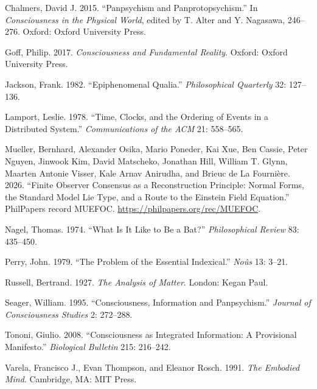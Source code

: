 \documentclass[
  11pt,
]{article}
\begin{document}
Chalmers, David J. 2015. ``Panpsychism and Panprotopsychism.'' In
\emph{Consciousness in the Physical World}, edited by T. Alter and Y.
Nagasawa, 246--276. Oxford: Oxford University Press.

Goff, Philip. 2017. \emph{Consciousness and Fundamental Reality}.
Oxford: Oxford University Press.

Jackson, Frank. 1982. ``Epiphenomenal Qualia.'' \emph{Philosophical
Quarterly} 32: 127--136.

Lamport, Leslie. 1978. ``Time, Clocks, and the Ordering of Events in a
Distributed System.'' \emph{Communications of the ACM} 21: 558--565.

Mueller, Bernhard, Alexander Osika, Mario Poneder, Kai Xue, Ben Cassie, Peter
Nguyen, Jinwook Kim, David Matscheko, Jonathan Hill, William T. Glynn, Maarten
Antonie Visser, Kale Arnav Anirudha, and Brieuc de La Fournière. 2026. ``Finite
Observer Consensus as a Reconstruction Principle: Normal Forms, the Standard
Model Lie Type, and a Route to the Einstein Field Equation.'' PhilPapers record
MUEFOC. \url{https://philpapers.org/rec/MUEFOC}.

Nagel, Thomas. 1974. ``What Is It Like to Be a Bat?''
\emph{Philosophical Review} 83: 435--450.

Perry, John. 1979. ``The Problem of the Essential Indexical.''
\emph{Noûs} 13: 3--21.

Russell, Bertrand. 1927. \emph{The Analysis of Matter}. London: Kegan
Paul.

Seager, William. 1995. ``Consciousness, Information and Panpsychism.''
\emph{Journal of Consciousness Studies} 2: 272--288.

Tononi, Giulio. 2008. ``Consciousness as Integrated Information: A
Provisional Manifesto.'' \emph{Biological Bulletin} 215: 216--242.

Varela, Francisco J., Evan Thompson, and Eleanor Rosch. 1991. \emph{The
Embodied Mind}. Cambridge, MA: MIT Press.
\end{document}
